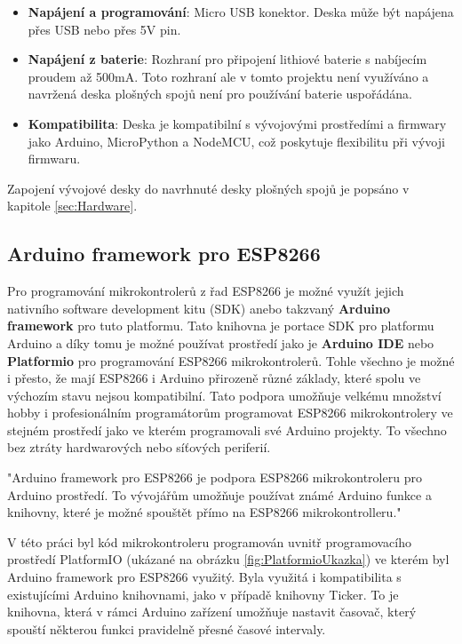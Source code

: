 \begin{itemize}
	\item \textbf{Napájení a programování}: Micro USB konektor. Deska může být napájena přes USB nebo přes 5V pin.
	\item \textbf{Napájení z baterie}: Rozhraní pro připojení lithiové baterie s nabíjecím proudem až 500mA. Toto rozhraní ale v tomto projektu není využíváno a navržená deska plošných spojů není pro používání baterie uspořádána.
	\item \textbf{Kompatibilita}: Deska je kompatibilní s vývojovými prostředími a firmwary jako Arduino, MicroPython a NodeMCU, což poskytuje flexibilitu při vývoji firmwaru.
\end{itemize}

Zapojení vývojové desky do navrhnuté desky plošných spojů je popsáno v kapitole \ref{sec:Hardware}.

\subsection{Arduino framework pro ESP8266}\label{sec:ArduinoFrameworkForESP8266}

Pro programování mikrokontrolerů z řad ESP8266 je možné využít jejich nativního software development kitu (SDK) anebo takzvaný \textbf{Arduino framework} pro tuto platformu. Tato knihovna je portace SDK pro platformu Arduino a díky tomu je možné používat prostředí jako je \textbf{Arduino IDE} nebo \textbf{Platformio} pro programování ESP8266 mikrokontrolerů. Tohle všechno je možné i přesto, že mají ESP8266 i Arduino přirozeně různé základy, které spolu ve výchozím stavu nejsou kompatibilní. Tato podpora umožňuje velkému množství hobby i profesionálním programátorům programovat ESP8266 mikrokontrolery ve stejném prostředí jako ve kterém programovali své Arduino projekty. To všechno bez ztráty hardwarových nebo síťových periferií.

"Arduino framework pro ESP8266 je podpora ESP8266 mikrokontroleru pro Arduino prostředí. To vývojářům umožňuje používat známé Arduino funkce a knihovny, které je možné spouštět přímo na ESP8266 mikrokontrolleru." \cite{ESP8266ArduinoFrameworkGithub}

V této práci byl kód mikrokontroleru programován uvnitř programovacího prostředí PlatformIO (ukázané na obrázku \ref{fig:PlatformioUkazka}) ve kterém byl Arduino framework pro ESP8266 využitý. Byla využitá i kompatibilita s existujícími Arduino knihovnami, jako v případě knihovny Ticker. To je knihovna, která v rámci Arduino zařízení umožňuje nastavit časovač, který spouští některou funkci pravidelně přesné časové intervaly.

